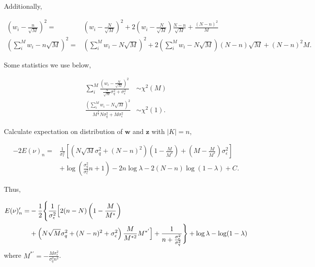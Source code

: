 Additionally, 

\begin{equation}
\begin{aligned}
    \left(w_i-\frac{n}{\sqrt{M}}\right)^2 =& \left(w_i - \frac{N}{\sqrt{M}}\right)^2 + 2\left(w_i - \frac{N}{\sqrt{M}}\right)\frac{N-n}{\sqrt{M}} + \frac{(N-n)^2}{M} \\
    \left(\sum_i^M w_i-n\sqrt{M}\right)^2 =& \left(\sum_i^M w_i-N\sqrt{M}\right)^2 + 2\left(\sum_i^M w_i-N\sqrt{M}\right)(N-n)\sqrt{M} + (N-n)^2M.
\end{aligned}
\end{equation}

Some statistics we use below,

\begin{equation}
\begin{aligned}
    \sum_i^M\frac{(w_i - \frac{N}{\sqrt{M}})^2}{\frac{N}{\sqrt{M}}\sigma_q^2+\sigma_\epsilon^2} &\sim \chi^2(M) \\
    \frac{(\sum_i^M w_i-N\sqrt{M})^2}{M^{\frac{3}{2}}N\sigma_q^2+M\sigma_\epsilon^2} &\sim \chi^2(1).
\end{aligned}
\end{equation}

Calculate expectation on distribution of $\bm{w}$ and $\bm{z}$ with $|K|=n$, 

\begin{equation}
\begin{aligned}
    -2E(\nu)_n =& \frac{1}{\sigma_\epsilon^2}\left[\left(N\sqrt{M}\sigma_q^2+(N-n)^2\right)\left(1-\frac{M}{M^\ast}\right)+\left(M-\frac{M}{M^\ast}\right)\sigma_\epsilon^2\right] \\
    &+ \log\left(\frac{\sigma_q^2}{\sigma_\epsilon^2}n+1\right) - 2n\log\lambda - 2(N-n)\log(1-\lambda) + C.
\end{aligned}
\end{equation}

Thus, 

\begin{equation}
\begin{aligned}
    E(\nu)_n' =& -\frac{1}{2}\Biggl\{\frac{1}{\sigma_\epsilon^2}\Bigl[2(n-N)\left(1-\frac{M}{M^\ast}\right) \\
    &+\left(N\sqrt{M}\sigma_q^2+(N-n)^2+\sigma_\epsilon^2\right)\frac{M}{M^{\ast2}}M^{\ast'}\Bigr] +\frac{1}{n+\frac{\sigma_\epsilon^2}{\sigma_q^2}}\Biggr\} + \log\lambda - \log(1-\lambda)
\end{aligned}
\end{equation}
where $M^{\ast'}=-\frac{M\sigma_\epsilon^2}{\sigma_q^2n^2}$. 

